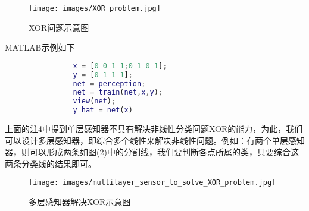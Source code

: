             \begin{figure}[H]
            \centering
            \texttt{[image: images/XOR\_problem.jpg]}
            \caption{XOR问题示意图}
            \label{fig:XOR问题示意图}
            \end{figure}
                \par
                MATLAB示例如下
                \begin{lstlisting}[language = Matlab]
                %% 单层感知器 perception
                x = [0 0 1 1;0 1 0 1];
                y = [0 1 1 1];
                net = perception;
                net = train(net,x,y);
                view(net);
                y_hat = net(x)
                \end{lstlisting}
                \par
                上面的注4中提到单层感知器不具有解决非线性分类问题XOR的能力，为此，我们可以设计多层感知器，即综合多个线性来解决非线性问题。例如：有两个单层感知器，则可以形成两条如图(\ref{fig:多层感知器解决XOR示意图})中的分割线，我们要判断各点所属的类，只要综合这两条分类线的结果即可。
            \begin{figure}[H]
            \centering
            \texttt{[image: images/multilayer\_sensor\_to\_solve\_XOR\_problem.jpg]}
            \caption{多层感知器解决XOR示意图}
            \label{fig:多层感知器解决XOR示意图}
            \end{figure}

